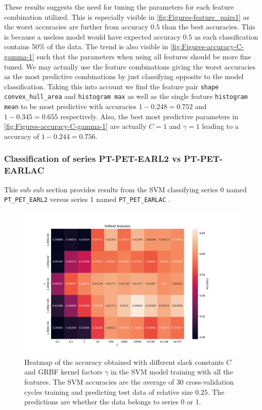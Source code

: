 These results suggests the need for tuning the parameters for each feature combination utilized. 
This is especially visible in \autoref{fig:Figures-feature_pairs1} as the worst accuracies are further from accuracy $0.5$ than 
the best accuracies. This is because a useless model would have expected accuracy $0.5$ as each classification contains 50\% of the data. 
The trend is also visible in \autoref{fig:Figures-accuracy-C-gamma-1} such that the parameters when using all features 
should be more fine tuned. We may actually use the feature combinations giving the worst accuracies as the most predictive combinations 
by just classifying opposite to the model classification. Taking this into account we find 
the feature pair \verb|shape convex_hull_area| and \verb|histogram max| as well as the single feature 
\verb|histogram mean| to be most predictive with accuracies $1-0.248=0.752$ and $1-0.345=0.655$ respectively.  
Also, the best most predictive parameters in \autoref{fig:Figures-accuracy-C-gamma-1} are actually $C=1$ and $\gamma =1$
leading to a accuracy of $1-0.244=0.756$.  


\subsubsection{Classification of series PT-PET-EARL2 vs PT-PET-EARLAC}
\label{sec:SVM2}
This sub sub section provides results from the SVM classifying series 0 named \verb|PT_PET_EARL2|
versus series 1 named \verb|PT_PET_EARLAC| . 


\begin{figure}[H]
\centering
\includegraphics[width=1\textwidth]{Figures/accuracy(C,gamma)4}
\caption{Heatmap of the accuracy obtained with different slack constants $C$ and 
GRBF kernel factors $\gamma $ in the SVM model training with all the features. The SVM accuracies are the average of $30$ cross-validation 
cycles training and predicting test data of relative size $0.25$.
 The predictions are whether the data belongs to series 0 or 1.}
\label{fig:Figures-accuracy-C-gamma-4}
\end{figure}


